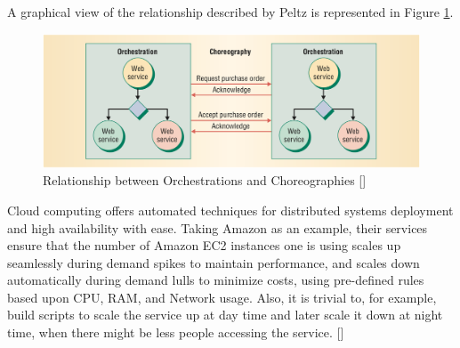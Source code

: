A graphical view of the relationship described by Peltz is represented in Figure \ref{relation-orchestrationXchoreography}.

\begin{figure}[htb]
	\centering
	\includegraphics[width=\textwidth]{images/relation-orchestrationXchoreography}
	\caption{Relationship between Orchestrations and Choreographies [\citet{WSOC}]}
	\label{relation-orchestrationXchoreography}
\end{figure}


Cloud computing offers automated techniques for distributed systems deployment and high availability with ease. Taking Amazon as an example, their services ensure that the number of Amazon EC2 instances one is using scales up seamlessly during demand spikes to maintain performance, and scales down automatically during demand lulls to minimize costs, using pre-defined rules based upon CPU, RAM, and Network usage. Also, it is trivial to, for example, build scripts to scale the service up at day time and later scale it down at night time, when there might be less people accessing the service. [\citet{AUTO-SCALE}]

